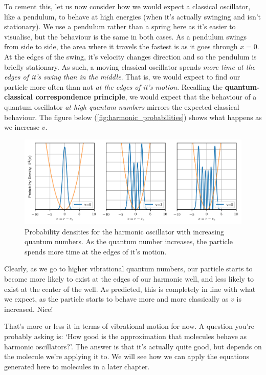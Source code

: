 \documentclass{memoir}[11pt,oneside,a4paper,openany]
\begin{document}
To cement this, let us now consider how we would expect a classical oscillator, like a pendulum, to behave at high energies (when it's actually swinging and isn't stationary). We use a pendulum rather than a spring here as it's easier to visualise, but the behaviour is the same in both cases. As a pendulum swings from side to side, the area where it travels the fastest is as it goes through $x=0$. At the edges of the swing, it's velocity changes direction and so the pendulum is briefly stationary. As such, a moving classical oscillator spends \emph{more time at the edges of it's swing than in the middle}. That is, we would expect to find our particle more often than not \emph{at the edges of it's motion}. Recalling the \textbf{quantum-classical correspondence principle}, we would expect that the behaviour of a quantum oscillator \emph{at high quantum numbers} mirrors the expected classical behaviour. The figure below (\autoref{fig:harmonic_probabilities}) shows what happens as we increase $v$. 
\begin{figure}[h]
	\centering
	\includegraphics[width=\textwidth]{harmonic_oscillator_probabilities}
	\caption{Probability densities for the harmonic oscillator with increasing quantum numbers. As the quantum number increases, the particle spends more time at the edges of it's motion.}\label{fig:harmonic_probabilities}
\end{figure}
Clearly, as we go to higher vibrational quantum numbers, our particle starts to become more likely to exist at the edges of our harmonic well, and less likely to exist at the center of the well. As predicted, this is completely in line with what we expect, as the particle starts to behave more and more classically as $v$ is increased. Nice!

That's more or less it in terms of vibrational motion for now. A question you're probably asking is: `How good is the approximation that molecules behave as harmonic oscillators?'. The answer is that it's actually quite good, but depends on the molecule we're applying it to. We will see how we can apply the equations generated here to molecules in a later chapter. 
\end{document}
